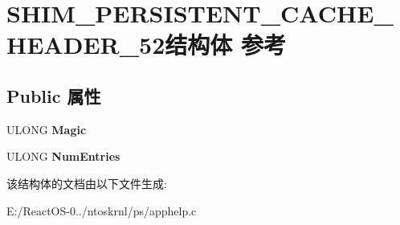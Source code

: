 \hypertarget{struct_s_h_i_m___p_e_r_s_i_s_t_e_n_t___c_a_c_h_e___h_e_a_d_e_r__52}{}\section{S\+H\+I\+M\+\_\+\+P\+E\+R\+S\+I\+S\+T\+E\+N\+T\+\_\+\+C\+A\+C\+H\+E\+\_\+\+H\+E\+A\+D\+E\+R\+\_\+52结构体 参考}
\label{struct_s_h_i_m___p_e_r_s_i_s_t_e_n_t___c_a_c_h_e___h_e_a_d_e_r__52}
\subsection*{Public 属性}
\begin{DoxyCompactItemize}
\item 
\mbox{\label{struct_s_h_i_m___p_e_r_s_i_s_t_e_n_t___c_a_c_h_e___h_e_a_d_e_r__52_affc1fb9931dae9a7a3c40a5682d52c36}} 
U\+L\+O\+NG {\bfseries Magic}
\item 
\mbox{\label{struct_s_h_i_m___p_e_r_s_i_s_t_e_n_t___c_a_c_h_e___h_e_a_d_e_r__52_a8979d6f192a05501c17570b02f8e1ee7}} 
U\+L\+O\+NG {\bfseries Num\+Entries}
\end{DoxyCompactItemize}


该结构体的文档由以下文件生成\+:\begin{DoxyCompactItemize}
\item 
E\+:/\+React\+O\+S-\/0../ntoskrnl/ps/apphelp.\+c\end{DoxyCompactItemize}
